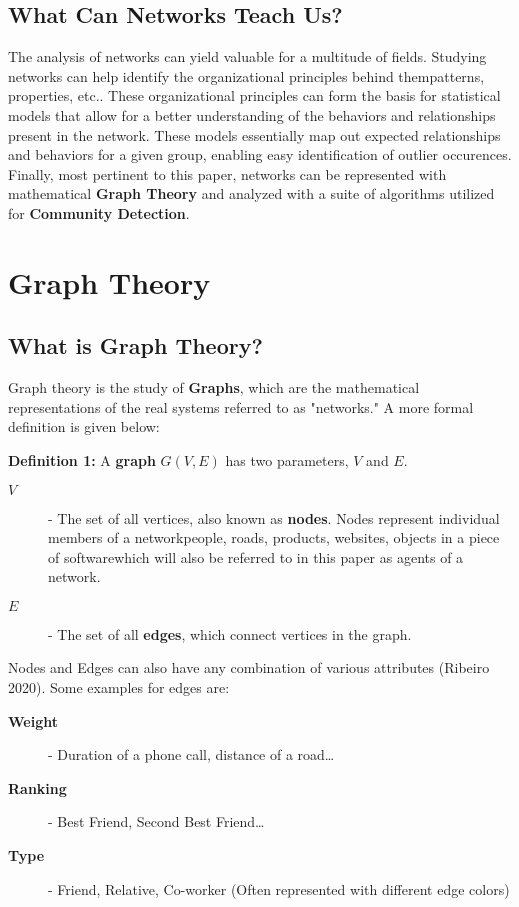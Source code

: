 \documentclass{article}
\begin{document}
\subsection*{What Can Networks Teach Us?}
The analysis of networks can yield valuable for a multitude of fields. Studying networks can help identify the organizational principles behind them\textemdash patterns, properties, etc.. These organizational principles can form the basis for statistical models
that allow for a better understanding of the behaviors and relationships present in the network. These models essentially map out expected relationships and behaviors for a given group, enabling easy identification of outlier occurences. Finally, most pertinent to this paper,
networks can be represented with mathematical \textbf{Graph Theory} and analyzed with a suite of algorithms utilized for \textbf{Community Detection}.

\section*{Graph Theory}

\subsection*{What is Graph Theory?}
Graph theory is the study of \textbf{Graphs}, which are the mathematical representations of the real systems referred to as "networks." A more formal definition is given below:

\bigskip

\noindent \textbf{Definition 1:} A \textbf{graph} $G(V, E)$ has two parameters, $V$ and $E$. 

\indent \begin{description}
  \item[\textbf{$V$}] - The set of all vertices, also known as \textbf{nodes}. Nodes represent individual members of a network\textemdash people, roads, products, websites, objects in a piece of software\textemdash which will also be referred to in this paper as agents of a network.
  \item[\textbf{$E$}] - The set of all \textbf{edges}, which connect vertices in the graph. 
\end{description}

\bigskip

\noindent Nodes and Edges can also have any combination of various attributes (Ribeiro 2020). Some examples for edges are:

\bigskip
\indent \begin{description}
  \item[\textbf{Weight}] - Duration of a phone call, distance of a road\dots
  \item[\textbf{Ranking}] - Best Friend, Second Best Friend\dots
  \item[\textbf{Type}] - Friend, Relative, Co-worker (Often represented with different edge colors)  
\end{description}
\end{document}
